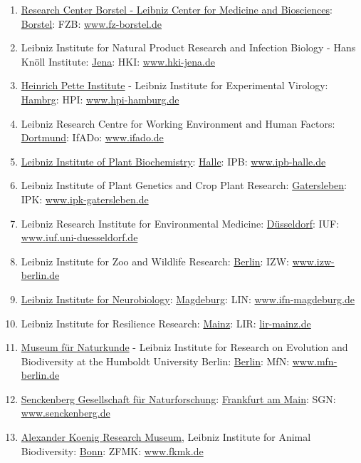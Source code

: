 \documentclass{book}
\numberwithin{equation}{section}
\begin{document}
\begin{enumerate}
    \item \href{https://en.wikipedia.org/wiki/Research_Center_Borstel}{Research Center Borstel - Leibniz Center for Medicine and Biosciences}: \href{https://en.wikipedia.org/wiki/Borstel,_Schleswig-Holstein}{Borstel}: FZB: \url{www.fz-borstel.de}
    \item Leibniz Institute for Natural Product Research and Infection Biology - Hans Knöll Institute: \href{https://en.wikipedia.org/wiki/Jena}{Jena}: HKI: \url{www.hki-jena.de}
    \item \href{https://en.wikipedia.org/wiki/Heinrich_Pette_Institute}{Heinrich Pette Institute} - Leibniz Institute for Experimental Virology: \href{https://en.wikipedia.org/wiki/Hamburg}{Hambrg}: HPI: \url{www.hpi-hamburg.de}
    \item Leibniz Research Centre for Working Environment and Human Factors: \href{https://en.wikipedia.org/wiki/Dortmund}{Dortmund}: IfADo: \url{www.ifado.de}
    \item \href{https://en.wikipedia.org/wiki/Leibniz_Institute_of_Plant_Biochemistry}{Leibniz Institute of Plant Biochemistry}: \href{https://en.wikipedia.org/wiki/Halle,_Saxony-Anhalt}{Halle}: IPB: \url{www.ipb-halle.de}
    \item Leibniz Institute of Plant Genetics and Crop Plant Research: \href{https://en.wikipedia.org/wiki/Gatersleben}{Gatersleben}: IPK: \url{www.ipk-gatersleben.de}
    \item Leibniz Research Institute for Environmental Medicine: \href{https://en.wikipedia.org/wiki/D%C3%BCsseldorf}{Düsseldorf}: IUF: \url{www.iuf.uni-duesseldorf.de}
    \item Leibniz Institute for Zoo and Wildlife Research: \href{https://en.wikipedia.org/wiki/Berlin}{Berlin}: IZW: \url{www.izw-berlin.de}
    \item \href{https://en.wikipedia.org/wiki/Leibniz_Institute_for_Neurobiology}{Leibniz Institute for Neurobiology}: \href{https://en.wikipedia.org/wiki/Magdeburg}{Magdeburg}: LIN: \url{www.ifn-magdeburg.de}
    \item Leibniz Institute for Resilience Research: \href{https://en.wikipedia.org/wiki/Mainz}{Mainz}: LIR: \url{lir-mainz.de}
    \item \href{https://en.wikipedia.org/wiki/Museum_f%C3%BCr_Naturkunde}{Museum für Naturkunde} - Leibniz Institute for Research on Evolution and Biodiversity at the Humboldt University Berlin: \href{https://en.wikipedia.org/wiki/Berlin}{Berlin}: MfN: \url{www.mfn-berlin.de}
    \item \href{https://en.wikipedia.org/wiki/Naturmuseum_Senckenberg}{Senckenberg Gesellschaft für Naturforschung}: \href{https://en.wikipedia.org/wiki/Frankfurt_am_Main}{Frankfurt am Main}: SGN: \url{www.senckenberg.de}
    \item \href{https://en.wikipedia.org/wiki/Museum_Koenig}{Alexander Koenig Research Museum}, Leibniz Institute for Animal Biodiversity: \href{https://en.wikipedia.org/wiki/Bonn}{Bonn}: ZFMK: \url{www.fkmk.de}
\end{enumerate}
\end{document}
